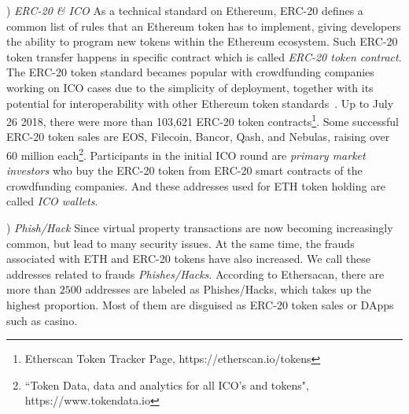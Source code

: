 


) \emph{ERC-20 \& ICO}
As a technical standard on Ethereum, ERC-20 defines a common list of rules that an Ethereum token has to implement, giving developers the ability to program new tokens within the Ethereum ecosystem. Such ERC-20 token transfer happens in specific contract which is called \emph{ERC-20 token contract}. The ERC-20 token standard becames popular with crowdfunding companies working on ICO cases due to the simplicity of deployment, together with its potential for interoperability with other Ethereum token standards~\cite{erc-20}. Up to July 26 2018, there were more than 103,621 ERC-20 token contracts\footnote{Etherscan Token Tracker Page, https://etherscan.io/tokens}. Some successful ERC-20 token sales are EOS, Filecoin, Bancor, Qash, and Nebulas, raising over 60 million each\footnote{``Token Data, data and analytics for all ICO's and tokens", https://www.tokendata.io}. Participants in the initial ICO round are \emph{primary market investors} who buy the ERC-20 token from ERC-20 smart contracts of the crowdfunding companies. And these addresses used for ETH token holding are called \emph{ICO wallets}.

) \emph{Phish/Hack}
Since virtual property transactions are now becoming increasingly common, but lead to many security issues. At the same time, the frauds associated with ETH and ERC-20 tokens have also increased. We call these addresses related to frauds \emph{Phishes/Hacks}. According to Ethersacan, there are more than $2500$ addresses are labeled as Phishes/Hacks, which takes up the highest proportion. Most of them are disguised as ERC-20 token sales or DApps such as casino. 

